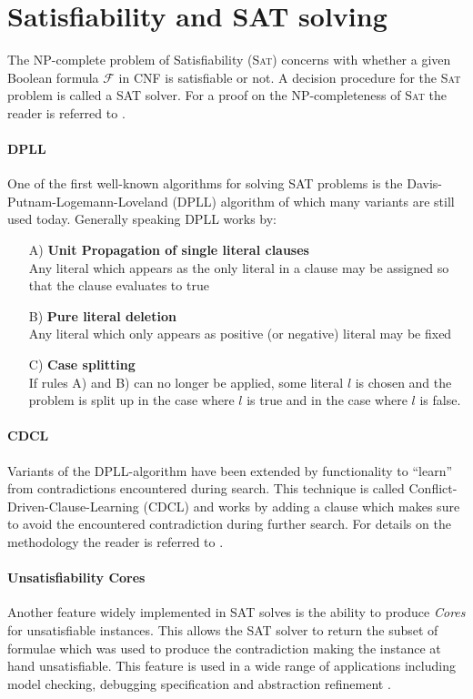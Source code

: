 \section{Satisfiability and SAT solving}
The \textsc{NP}-complete problem of Satisfiability (\textsc{Sat}) concerns with whether a given Boolean formula $\mathcal{F}$ in CNF is satisfiable or not.
A decision procedure for the \textsc{Sat} problem is called a SAT solver.
For a proof on the \textsc{NP}-completeness of \textsc{Sat} the reader is referred to \cite{Garey-Intractability}.

\paragraph{DPLL} One of the first well-known algorithms for solving SAT problems is the Davis\hyp{}Putnam\hyp{}Logemann\hyp{}Loveland (DPLL) algorithm \cite{DPLL} of which many variants are still used today.
Generally speaking DPLL works by:
\begin{itemize}
    \item[A)]   \textbf{Unit Propagation of single literal clauses}\\
                Any literal which appears as the only literal in a clause may be assigned so that the clause evaluates to true
    \item[B)]   \textbf{Pure literal deletion}\\
                Any literal which only appears as positive (or negative) literal may be fixed
    \item[C)]   \textbf{Case splitting}\\
                If rules A) and B) can no longer be applied, some literal $l$ is chosen and the problem is split up in the case where $l$ is true and in the case where $l$ is false.
\end{itemize}

\paragraph{CDCL} Variants of the DPLL-algorithm have been extended by functionality to \enquote{learn} from contradictions encountered during search. This technique is called Conflict\hyp{}Driven\hyp{}Clause\hyp{}Learning (CDCL) and works by adding a clause which makes sure to avoid the encountered contradiction during further search. For details on the methodology the reader is referred to \cite{Grasp}.

\paragraph{Unsatisfiability Cores}
Another feature widely implemented in SAT solves is the ability to produce \textit{Cores} for unsatisfiable instances.
This allows the SAT solver to return the subset of formulae which was used to  produce the contradiction making the instance at hand unsatisfiable. This feature is used in a wide range of applications including model checking, debugging specification and abstraction refinement \cite{Marques-Silva-PropositionalSATSolving}.

